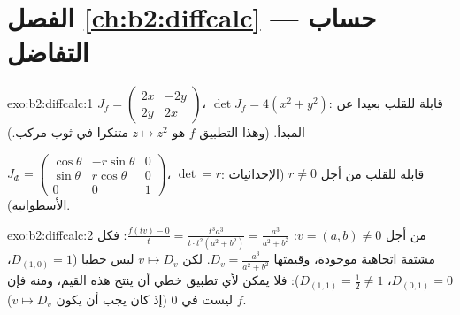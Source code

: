 \section*{الفصل \ref{ch:b2:diffcalc} --- حساب التفاضل}

\begin{solution}{exo:b2:diffcalc:1}
$J_f = \begin{pmatrix} 2x & -2y\\ 2y & 2x\end{pmatrix}$، $\det J_f
= 4(x^2 + y^2)$: قابلة للقلب بعيدا عن المبدأ. (وهذا التطبيق $f$ هو $z
\mapsto z^2$ متنكرا في ثوب مركب.)

$J_\Phi = \begin{pmatrix} \cos\theta & -r\sin\theta & 0\\
\sin\theta & r\cos\theta & 0\\ 0 & 0 & 1\end{pmatrix}$، $\det = r$:
قابلة للقلب من أجل $r \neq 0$ (الإحداثيات الأسطوانية).
\end{solution}

\begin{solution}{exo:b2:diffcalc:2}
من أجل $v = (a, b) \neq 0$: $\frac{f(tv) - 0}{t} = \frac{t^3a^3}{t\cdot
t^2(a^2+b^2)} = \frac{a^3}{a^2 + b^2}$: فكل مشتقة اتجاهية موجودة، وقيمتها $D_v = \frac{a^3}{a^2+b^2}$. لكن
$v
\mapsto D_v$ ليس خطيا ($D_{(1,0)} = 1$، $D_{(0,1)} = 0$،
$D_{(1,1)} = \frac12 \neq 1$): فلا يمكن لأي تطبيق خطي أن ينتج هذه القيم، ومنه فإن $f$
ليست  في $0$ (إذ كان يجب أن يكون  $v \mapsto D_v$).
\end{solution}

